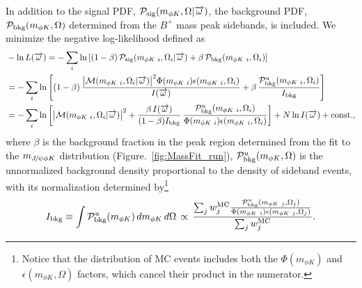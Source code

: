 In addition to the signal PDF, ${\cal P}_{\rm sig}(m_{\phi K},\Omega|\overrightarrow{\omega})$,
the background PDF, ${\cal P}_{\rm bkg}(m_{\phi K},\Omega)$ 
determined from the $B^+$ mass peak sidebands, is included.
%
We minimize the negative log-likelihood defined as
\begin{equation}
\begin{split}
& -\ln L(\Pars)=
-\sum_i\ln \left[ (1-\beta)\, \PDF_{\rm sig}(m_{\phi K~i},\Omega_i|\Pars)
    + \beta\, \PDF_{\rm bkg}(m_{\phi K~i},\Omega_i) \right] \\%
&=-\sum_i\ln \left[ (1-\beta)\,\frac{\big|\Mat(m_{\phi K~i},\Omega_i|\Pars)\big|^2 \Phi(m_{\phi K~i})\epsilon(m_{\phi K~i},\Omega_i)}{I(\Pars)}
+\beta\, \frac{\PDF_{\rm bkg}^{u}(m_{\phi K~i},\Omega_i)}{I_{\rm bkg}} \right] \\%
&=-\sum_i\ln \left[\big|\Mat(m_{\phi K~i},\Omega_i|\Pars)\big|^2  
+ \frac{\beta\,I(\Pars)}{(1-\beta) I_{\rm bkg}}\,\frac{\PDF_{\rm bkg}^{u}(m_{\phi K~i},\Omega_i)}{\Phi(m_{\phi K~i})\epsilon(m_{\phi K~i},\Omega_i)}\right]
+N\ln I(\Pars)+{\rm const.},
\end{split}
\end{equation}
where $\beta$ is the background fraction in the peak region determined from the fit to
the $m_{{{J\mskip -3mu/\mskip -2mu\psi}} \phi K}$ distribution (Figure.~\ref{fig:MassFit_run}), 
${\cal P}_{\rm bkg}^{u}(m_{\phi K},\Omega)$ is the unnormalized background density proportional to the density of sideband events,
with its normalization determined by\footnote{Notice that the distribution of MC events 
includes both the $\Phi(m_{\phi K})$ and $\epsilon(m_{\phi K},\Omega)$ factors, which cancel their product in the numerator.}
\begin{equation}
I_{\rm bkg}\equiv \int {\cal P}_{\rm bkg}^{u}(m_{\phi K})\,d m_{\phi K}\,d\Omega \, \propto \,
\frac{
\sum_j w_j^{\rm MC} \frac{{\cal P}_{\rm bkg}^{u}(m_{\phi K~j},\Omega_j)}{\Phi(m_{\phi K~i})\epsilon(m_{\phi K~j},\Omega_j)}}{
\sum_j w_j^{\rm MC}}.
\label{eq:bkgnor}
\end{equation}


